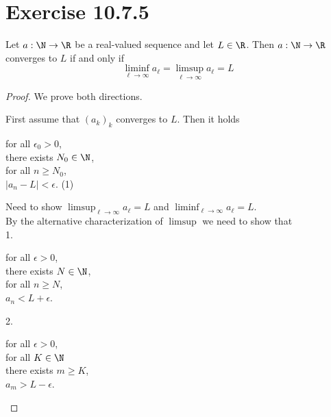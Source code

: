 \documentclass{article}
\begin{document}
    \section{Exercise 10.7.5}
    \begin{problem}
        Let $a: \N \to \R$ be a real-valued sequence and let $L \in \R$. Then $a: \N \to \R$ converges to $L$ if and only if
        $$\liminf_{\ell \to \infty}a_\ell = \limsup_{\ell\to\infty}a_\ell = L$$
    \end{problem}
    \begin{proof}[Proof]
        We prove both directions.

        First assume that $(a_k)_k$ converges to $L$.
        Then it holds
        \begin{center}
            \parbox{\linewidth}{
                \linewidth
                for all $\epsilon_0 > 0$, \\
                \hspace*{1em} there exists $N_0 \in \N$, \\
                \hspace*{2em} for all $n \ge N_0$, \\
                \hspace*{3em} $|a_n - L| < \epsilon$.
                \hfill (1)
            }
        \end{center}
        Need to show $\limsup_{\ell\to\infty}a_\ell = L$ and $\liminf_{\ell\to\infty}a_\ell = L$. \\
        By the alternative characterization of $\limsup$ we need to show that \\
        1. \begin{center}
            \parbox{\linewidth}{
                \linewidth
                for all $\epsilon > 0$, \\
                \hspace*{1em} there exists $N \in \N$, \\
                \hspace*{2em} for all $n \ge N$, \\
                \hspace*{3em} $a_n < L + \epsilon$.
            }
        \end{center}
        2. \begin{center}
            \parbox{\linewidth}{
                \linewidth
                for all $\epsilon > 0$, \\
                \hspace*{1em} for all $K \in \N$ \\
                \hspace*{2em} there exists $m \ge K$, \\
                \hspace*{3em} $a_m > L - \epsilon$.
            }
        \end{center}


\end{proof}
\end{document}
